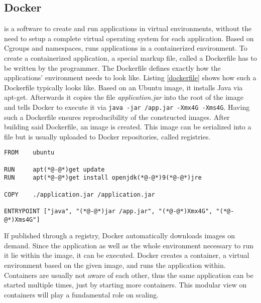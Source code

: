 
\subsection{Docker}
\docker{} is a software to create and run applications in virtual environments, without the need to setup a complete virtual operating system for each application. Based on Cgroups and namespaces, \docker{} runs applications in a containerized environment.
To create a containerized application, a special markup file, called a Dockerfile has to be written by the programmer. The Dockerfile defines exactly how the applications' environment needs to look like. Listing \ref{dockerfile} shows how such a Dockerfile typically looks like. Based on an Ubuntu image, it installs Java via apt-get. Afterwards it copies the file {\em{} application.jar} into the root of the image and tells Docker to execute it via \lstinline[]|java -jar /app.jar -Xmx4G -Xms4G|. Having such a Dockerfile ensures reproducibility of the constructed images. After building said Dockerfile, an image is created. This image can be serialized into a file but is usually uploaded to Docker repositories, called registries. 

\begin{minipage}{\textwidth}
	
\begin{lstlisting}[style=YAML,caption=A sample Dockerfile used for creating a simple Ubuntu based image to start a Java application.,label=dockerfile]
FROM	ubuntu

RUN		apt(*@-@*)get update
RUN		apt(*@-@*)get install openjdk(*@-@*)9(*@-@*)jre

COPY	./application.jar /application.jar

ENTRYPOINT ["java", "(*@-@*)jar /app.jar", "(*@-@*)Xmx4G", "(*@-@*)Xms4G"]
\end{lstlisting}

\end{minipage}

If published through a registry, Docker automatically downloads images on demand. Since the application as well as the whole environment necessary to run it lie within the image, it can be executed. Docker creates a container, a virtual environment based on the given image, and runs the application within. Containers are usually not aware of each other, thus the same application can be started multiple times, just by starting more containers. This modular view on containers will play a fundamental role on scaling.